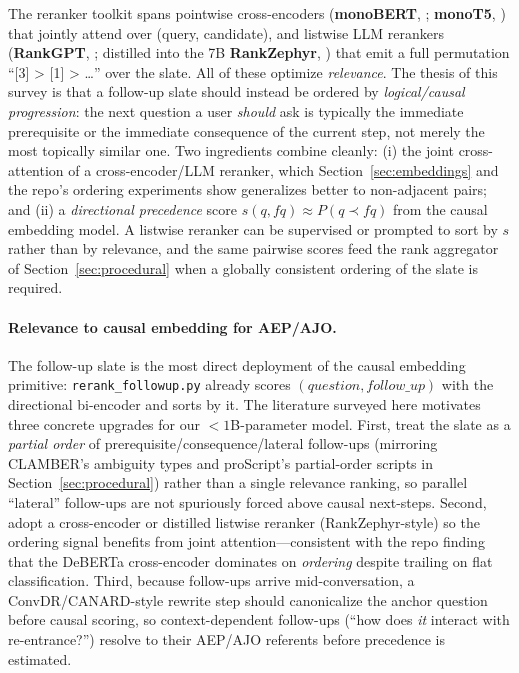The reranker toolkit spans pointwise cross-encoders
(\textbf{monoBERT}, \citealp{fu:nogueira2019bertrerank}; \textbf{monoT5},
\citealp{fu:nogueira2020monot5}) that jointly attend over (query, candidate),
and listwise LLM rerankers (\textbf{RankGPT}, \citealp{fu:sun2023rankgpt};
distilled into the 7B \textbf{RankZephyr}, \citealp{fu:pradeep2023rankzephyr})
that emit a full permutation ``[3] > [1] > \dots'' over the slate. All of these
optimize \emph{relevance}. The thesis of this survey is that a follow-up slate
should instead be ordered by \emph{logical/causal progression}: the next
question a user \emph{should} ask is typically the immediate prerequisite or the
immediate consequence of the current step, not merely the most topically
similar one. Two ingredients combine cleanly: (i) the joint cross-attention of a
cross-encoder/LLM reranker, which Section~\ref{sec:embeddings} and the repo's
ordering experiments show generalizes better to non-adjacent pairs; and (ii) a
\emph{directional precedence} score $s(q,fq)\approx P(q \prec fq)$ from the
causal embedding model. A listwise reranker can be supervised or prompted to
sort by $s$ rather than by relevance, and the same pairwise scores feed the rank
aggregator of Section~\ref{sec:procedural} when a globally consistent ordering
of the slate is required.

\paragraph{Relevance to causal embedding for AEP/AJO.}
The follow-up slate is the most direct deployment of the causal embedding
primitive: \texttt{rerank\_followup.py} already scores
$(question, follow\_up)$ with the directional bi-encoder and sorts by it. The
literature surveyed here motivates three concrete upgrades for our
$<\!1$B-parameter model. First, treat the slate as a \emph{partial order} of
prerequisite/consequence/lateral follow-ups (mirroring CLAMBER's ambiguity
types and proScript's partial-order scripts in Section~\ref{sec:procedural})
rather than a single relevance ranking, so parallel ``lateral'' follow-ups are
not spuriously forced above causal next-steps. Second, adopt a cross-encoder or
distilled listwise reranker (RankZephyr-style) so the ordering signal benefits
from joint attention---consistent with the repo finding that the DeBERTa
cross-encoder dominates on \emph{ordering} despite trailing on flat
classification. Third, because follow-ups arrive mid-conversation, a
ConvDR/CANARD-style rewrite step should canonicalize the anchor question before
causal scoring, so context-dependent follow-ups (``how does \emph{it} interact
with re-entrance?'') resolve to their AEP/AJO referents before precedence is
estimated.
